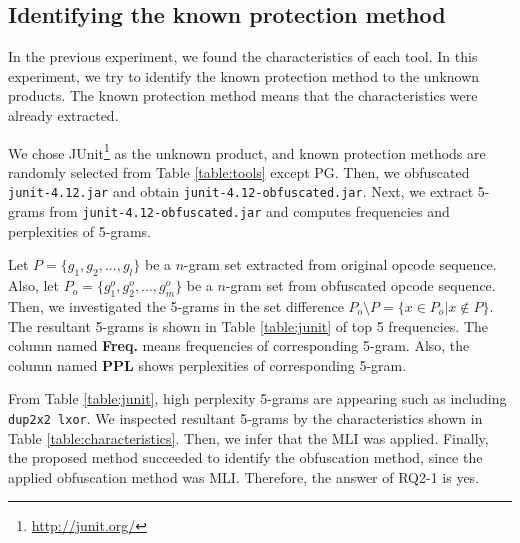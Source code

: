 \documentclass[conference]{IEEEtran}
\begin{document}
\subsection{Identifying the known protection method}\label{sect:rq2-1}

In the previous experiment, we found the characteristics of each tool.
In this experiment, we try to identify the known protection method to
the unknown products.  The known protection method means that the
characteristics were already extracted.

We chose JUnit\footnote[5]{\url{http://junit.org/}} as the unknown
product, and known protection methods are randomly selected from Table
\ref{table:tools} except PG.  Then, we obfuscated \texttt{
  junit-4.12.jar} and obtain \texttt{junit-4.12-obfuscated.jar}.
Next, we extract 5-grams from \texttt{junit-4.12-obfuscated.jar} and
computes frequencies and perplexities of 5-grams.

Let $P=\{ g_1, g_2, ..., g_l \}$ be a $n$-gram set extracted from
original opcode sequence.  Also, let $P_o=\{ g^o_1, g^o_2, ..., g^o_m
\}$ be a $n$-gram set from obfuscated opcode sequence.  Then, we
investigated the 5-grams in the set difference $P_o \setminus P = \{ x
\in P_o | x \not\in P \}$.  The resultant 5-grams is shown in Table
\ref{table:junit} of top 5 frequencies.  The column named
\textbf{Freq.} means frequencies of corresponding 5-gram.  Also, the
column named \textbf{PPL} shows perplexities of corresponding 5-gram.

From Table \ref{table:junit}, high perplexity 5-grams are appearing
such as including \texttt{dup2x2 lxor}.  We inspected resultant
5-grams by the characteristics shown in Table
\ref{table:characteristics}.  Then, we infer that the MLI was applied.
Finally, the proposed method succeeded to identify the obfuscation
method, since the applied obfuscation method was MLI.  Therefore, the
answer of RQ2-1 is yes.

\end{document}
